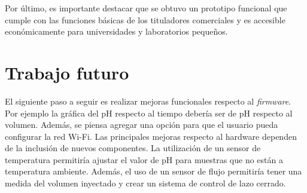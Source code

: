 Por último, es importante destacar que se obtuvo un prototipo funcional que cumple con las funciones básicas de los tituladores comerciales y es accesible económicamente para universidades y laboratorios pequeños.

\section{Trabajo futuro}

El siguiente paso a seguir es realizar mejoras funcionales respecto al \textit{firmware}. Por ejemplo la gráfica del pH respecto al tiempo debería ser de pH respecto al volumen. Además, se piensa agregar una opción para que el usuario pueda configurar la red Wi-Fi. Las principales mejoras respecto al hardware dependen de la inclusión de nuevos componentes. La utilización de un sensor de temperatura permitiría ajustar el valor de pH para muestras que no están a temperatura ambiente. Además, el uso de un sensor de flujo permitiría tener una medida del volumen inyectado y crear un sistema de control de lazo cerrado.
